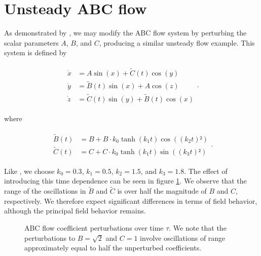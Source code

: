 \section{Unsteady ABC flow}\label{sec:unsteady_abc_flow}

As demonstrated by \cite{Oettinger}, we may modify the ABC flow system by perturbing the scalar parameters $A$, $B$, and $C$, producing a similar unsteady flow example. This system is defined by

\begin{align}\label{eq:unsteady_abc_flow}
\begin{aligned}
\dot{x} &= A\sin(x) + \tilde{C}(t)\cos(y)\\
\dot{y} &= \tilde{B}(t)\sin(x) + A\cos(z)\\
\dot{z} &= \tilde{C}(t)\sin(y) + \tilde{B}(t)\cos(x)
\end{aligned}.
\end{align}

\noindent where

\begin{align}\label{eq:perturbation}
\begin{aligned}
\tilde{B}(t) &= B + B\cdot k_0\tanh(k_1t)\cos((k_2t)²)\\
\tilde{C}(t) &= C + C\cdot k_0\tanh(k_1t)\sin((k_3t)²)
\end{aligned}.
\end{align}

Like \cite{Oettinger}, we choose $k_0=0.3$, $k_1=0.5$, $k_2=1.5$, and $k_3=1.8$. The effect of introducing this time dependence can be seen in figure \ref{fig:coefficients}. We observe that the range of the oscillations in $\tilde{B}$ and $\tilde{C}$ is over half the magnitude of $B$ and $C$, respectively. We therefore expect significant differences in terms of field behavior, although the principal field behavior remains. 

\begin{figure}[h!] 
\centering
\resizebox{0.9\textwidth}{!}{}
\caption{ABC flow coefficient perturbations over time $\tau$. We note that the perturbations to $B=\sqrt{2}$ and $C=1$ involve oscillations of range approximately equal to half the unperturbed coefficients.}\label{fig:coefficients}
\end{figure}

